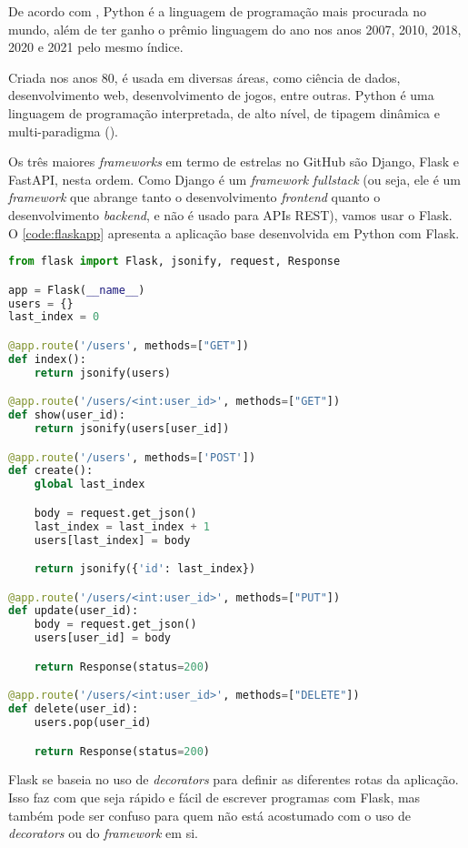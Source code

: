 De acordo com \textcite{tiobeindex}, Python é a linguagem de programação mais procurada
no mundo, além de ter ganho o prêmio linguagem do ano nos anos 2007, 2010, 2018,
2020 e 2021 pelo mesmo índice.

Criada nos anos 80, é usada em diversas áreas, como ciência de
dados, desenvolvimento web, desenvolvimento de jogos, entre outras. Python é uma
linguagem de programação interpretada, de alto nível, de tipagem dinâmica e
multi-paradigma (\textcite{pythonmanual}).

Os três maiores \textit{frameworks} em termo de estrelas no GitHub são Django,
Flask e FastAPI, nesta ordem. Como Django é um \textit{framework fullstack} (ou seja,
ele é um \textit{framework} que abrange tanto o desenvolvimento \textit{frontend}
quanto o desenvolvimento \textit{backend}, e não é usado para APIs REST), vamos
usar o Flask. O \autoref{code:flaskapp} apresenta a aplicação base desenvolvida
em Python com Flask.

\begin{lstlisting}[language=Python,label={code:flaskapp},caption={Aplicação base em Python com Flask}]
from flask import Flask, jsonify, request, Response

app = Flask(__name__)
users = {}
last_index = 0

@app.route('/users', methods=["GET"])
def index():
    return jsonify(users)

@app.route('/users/<int:user_id>', methods=["GET"])
def show(user_id):
    return jsonify(users[user_id])

@app.route('/users', methods=['POST'])
def create():
    global last_index

    body = request.get_json()
    last_index = last_index + 1
    users[last_index] = body

    return jsonify({'id': last_index})

@app.route('/users/<int:user_id>', methods=["PUT"])
def update(user_id):
    body = request.get_json()
    users[user_id] = body

    return Response(status=200)

@app.route('/users/<int:user_id>', methods=["DELETE"])
def delete(user_id):
    users.pop(user_id)

    return Response(status=200)

\end{lstlisting}

Flask se baseia no uso de \textit{decorators} para definir as diferentes rotas
da aplicação. Isso faz com que seja rápido e fácil de escrever programas com Flask,
mas também pode ser confuso para quem não está acostumado com o uso de \textit{decorators}
ou do \textit{framework} em si.

